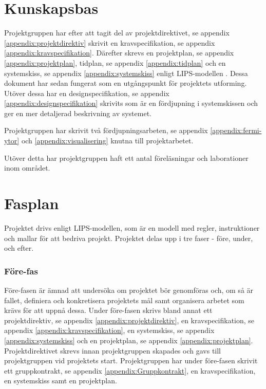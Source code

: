 \documentclass[a4paper,12pt]{article}
\begin{document}
\section{Kunskapsbas}
\label{ch:kunskapsbas}
Projektgruppen har efter att tagit del av projektdirektivet, se appendix \ref{appendix:projektdirektiv}
skrivit en kravspecifikation, se appendix \ref{appendix:kravspecifikation}. Därefter skrevs en projektplan, se appendix \ref{appendix:projektplan}, tidplan, se appendix \ref{appendix:tidplan} och en  systemskiss, se appendix \ref{appendix:systemskiss} enligt LIPS-modellen \cite{LIPS}. 
Dessa dokument har sedan fungerat som en utgångspunkt för projektets utforming. Utöver dessa har en designspecifikation, se appendix \ref{appendix:designspecifikation} skrivits som är en fördjupning i systemskissen och ger en mer detaljerad beskrivning av systemet.

Projektgruppen har skrivit två fördjupningsarbeten, se appendix \ref{appendix:fermi-ytor} och \ref{appendix:visualisering} knutna till projektarbetet.

Utöver detta har projektgruppen haft ett antal föreläsningar och laborationer inom området.

\section{Fasplan}
\label{ch:fasplan}
Projektet drivs enligt LIPS-modellen, som är en modell med regler, instruktioner och mallar för att bedriva projekt. Projektet delas upp i tre faser - före, under, och efter.

\subsubsection{Före-fas}
Före-fasen är ämnad att undersöka om projektet bör genomföras och, om så är fallet, definiera och konkretisera projektets mål samt organisera arbetet som krävs för att uppnå dessa. Under före-fasen skrivs bland annat ett projektdirektiv, se appendix \ref{appendix:projektdirektiv}, en kravspecifikation, se appendix \ref{appendix:kravspecifikation}, en systemskiss, se appendix \ref{appendix:systemskiss} och en projektplan, se appendix \ref{appendix:projektplan}. Projektdirektivet skrevs innan projektgruppen skapades och gavs till projektgruppen vid projektets start.
Projektgruppen har under före-fasen skrivit ett gruppkontrakt, se appendix \ref{appendix:Gruppkontrakt}, en kravspecifikation, en systemskiss samt en projektplan.
\end{document}
